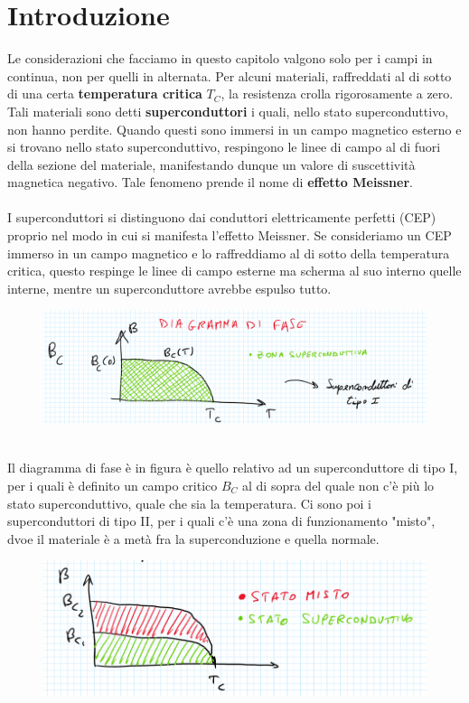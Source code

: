 \documentclass{book}
\begin{document}
    \section{Introduzione}
        Le considerazioni che facciamo in questo capitolo valgono solo per i campi in continua, non per quelli in alternata. Per alcuni materiali, raffreddati al di sotto di una certa \textbf{temperatura critica} $T_{C}$, la resistenza crolla rigorosamente a zero. Tali materiali sono detti \textbf{superconduttori} i quali, nello stato superconduttivo, non hanno perdite. Quando questi sono immersi in un campo magnetico esterno e si trovano nello stato superconduttivo, respingono le linee di campo al di fuori della sezione del materiale, manifestando dunque un valore di suscettività magnetica negativo. Tale fenomeno prende il nome di \textbf{effetto Meissner}. \\ \\
        I superconduttori si distinguono dai conduttori elettricamente perfetti (CEP) proprio nel modo in cui si manifesta l'effetto Meissner. Se consideriamo un CEP immerso in un campo magnetico e lo raffreddiamo al di sotto della temperatura critica, questo respinge le linee di campo esterne ma scherma al suo interno quelle interne, mentre un superconduttore avrebbe espulso tutto.
        \begin{figure}[h!]
            \centering
            \includegraphics[width=0.65\linewidth]{img/pippo2.png}
        \end{figure}
        \\ Il diagramma di fase è in figura è quello relativo ad un superconduttore di tipo I, per i quali è definito un campo critico $B_{C}$ al di sopra del quale non c'è più lo stato superconduttivo, quale che sia la temperatura. \newpage
        Ci sono poi i superconduttori di tipo II, per i quali c'è una zona di funzionamento "misto", dvoe il materiale è a metà fra la superconduzione e quella normale.
        \begin{figure}[h!]
            \centering
            \includegraphics[width=0.5\linewidth]{img/pop12.png}
        \end{figure}
\end{document}
